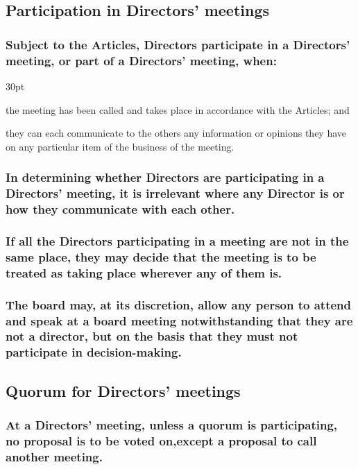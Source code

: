 \documentclass[12pt]{article}
\def\clauseindent{30pt}
\newenvironment{subindentpara}{\begin{adjustwidth}{\clauseindent}{}\begin{hanginglist}}{\end{hanginglist}\end{adjustwidth}}
\begin{document}
\subsection{Participation in Directors' meetings}
\subsubsection[Specifics of participation in Directors' meetings]{Subject to the Articles, Directors participate in a Directors' meeting, or part of a Directors' meeting, when:}
\begin{subindentpara}
  \item the meeting has been called and takes place in accordance with the Articles; and
  \item they can each communicate to the others any information or opinions they have on any particular item of the business of the meeting.
\end{subindentpara}
\subsubsection[Location of participation in Director's meetings is irrelevantt]{In determining whether Directors are participating in a Directors' meeting, it is irrelevant where any Director is or how they communicate with each other.}
\subsubsection[Nominal location of a meeting is at Directors' discretion]{If all the Directors participating in a meeting are not in the same place, they may decide that the meeting is to be treated as taking place wherever any of them is.}
\subsubsection[Directors' may authorise any person to speak at a meeting]{The board may, at its discretion, allow any person to attend and speak at a board meeting notwithstanding that they are not a director, but on the basis that they must not participate in decision-making.}

\subsection{Quorum for Directors' meetings}
\subsubsection[Quorum at Directors' meetings is fundamental]{At a Directors' meeting, unless a quorum is participating, no proposal is to be voted on,except a proposal to call another meeting.}
\end{document}
